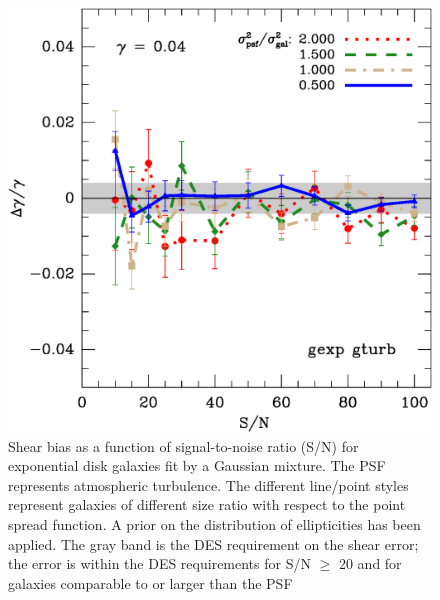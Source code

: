 \documentclass[12pt]{article}
\begin{document}
\begin{figure}[p]
\centering

\includegraphics[scale=0.4]{mcbayes-get01r05r06r07r08-yr-0.050-0.050-frac.eps}
\caption{Shear bias as a function of signal-to-noise ratio (S/N) for
exponential disk galaxies fit by a Gaussian mixture.  The PSF represents
atmospheric turbulence.  The different line/point styles represent galaxies of
different size ratio with respect to the point spread function.  A prior on the
distribution of ellipticities has been applied.  The gray band is the DES
requirement on the shear error; the error is within the DES requirements for
S/N $\geq$ 20 and for galaxies comparable to or larger than the
PSF\label{fig:get}}

\end{figure}
\end{document}
